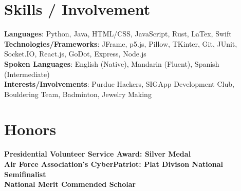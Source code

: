 \documentclass[letterpaper,11pt]{article}
\begin{document}
%
\section{Skills / Involvement}
 \begin{itemize}[leftmargin=0.15in, label={}]
    \small{\item{
     \textbf{Languages}{: Python, Java, HTML/CSS, JavaScript, Rust, LaTex, Swift} \\
     \textbf{Technologies/Frameworks}{: JFrame, p5.js, Pillow, TKinter, Git, JUnit, Socket.IO, React.js, GoDot, Express, Node.js} \\
     \textbf{Spoken Languages}{: English (Native), Mandarin (Fluent), Spanish (Intermediate)} \\
     \textbf{Interests/Involvements}{: Purdue Hackers, SIGApp Development Club, Bouldering Team, Badminton, Jewelry Making} \\
    }}
 \end{itemize}
 \vspace{-16pt}


\section{Honors}
 \begin{itemize}[leftmargin=0.15in, label={}]
    \small{\item{
     \textbf{Presidential Volunteer Service Award: Silver Medal} \\
     \textbf{Air Force Association's CyberPatriot: Plat Divison National Semifinalist} \\
     \textbf{National Merit Commended Scholar} \\
    }}
 \end{itemize}
 \vspace{-16pt}
\end{document}
